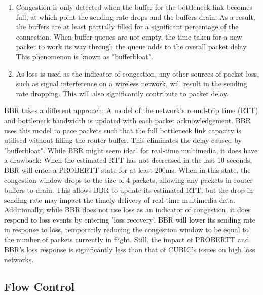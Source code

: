 \documentclass{mpaper}
\begin{document}
\begin{enumerate}
\item Congestion is only detected when the buffer for the bottleneck link becomes full, at which point the sending rate drops and the buffers drain. As a result, the buffers are at least partially filled for a significant percentage of the connection. When buffer queues are not empty, the time taken for a new packet to work its way through the queue adds to the overall packet delay. This phenomenon is known as "bufferbloat".
\item As loss is used as the indicator of congestion, any other sources of packet loss, such as signal interference on a wireless network, will result in the sending rate dropping. This will also significantly contribute to packet delay.
\end{enumerate}

\noindent BBR takes a different approach; A model of the network's round-trip time (RTT) and bottleneck bandwidth is updated with each packet acknowledgement. BBR uses this model to pace packets such that the full bottleneck link capacity is utilised without filling the router buffer. This eliminates the delay caused by "bufferbloat". While BBR might seem ideal for real-time multimedia, it does have a drawback: When the estimated RTT has not decreased in the last 10 seconds, BBR will enter a PROBERTT state for at least 200ms. When in this state, the congestion window drops to the size of 4 packets, allowing any packets in router buffers to drain. This allows BBR to update its estimated RTT, but the drop in sending rate may impact the timely delivery of real-time multimedia data. Additionally, while BBR does not use loss as an indicator of congestion, it does respond to loss events by entering 'loss recovery'. BBR will lower its sending rate in response to loss, temporarily reducing the congestion window to be equal to the number of packets currently in flight. Still, the impact of PROBERTT and BBR's loss response is significantly less than that of CUBIC's issues on high loss networks. 


\subsection{Flow Control} \label{Flow Control}
\end{document}
